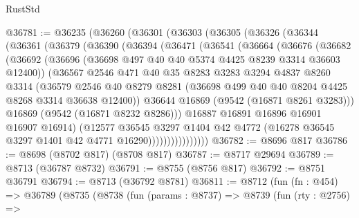 \begin{lexlean}{RustStd}
\begin{coremodule}
@36781 := @36235
    (@36260
      (@36301
        (@36303
          (@36305
            (@36326
              (@36344
                (@36361
                  (@36379
                    (@36390
                      (@36394
                        (@36471
                          (@36541
                            (@36664
                              (@36676
                                (@36682
                                  (@36692
                                    (@36696
                                      (@36698 @497 @40 @40 @5374 @4425 @8239 @3314 @36603 @12400))
                                    (@36567
                                      @2546
                                      @471
                                      @40
                                      @35
                                      @8283
                                      @3283
                                      @3294
                                      @4837
                                      @8260
                                      @3314
                                      (@36579
                                        @2546
                                        @40
                                        @8279
                                        @8281
                                        (@36698 @499 @40 @40 @8204 @4425 @8268 @3314 @36638 @12400))
                                      @36644
                                      @16869
                                      (@9542 (@16871 @8261 @3283)))
                                    @16869
                                    (@9542 (@16871 @8232 @8286)))
                                  @16887
                                  @16891
                                  @16896
                                  @16901
                                  @16907
                                  @16914)
                                (@12577
                                  @36545
                                  @3297
                                  @1404
                                  @42
                                  @4772
                                  (@16278 @36545 @3297 @1401 @42 @4771 @16290))))))))))))))))
@36782 := @8696 @817
@36786 := @8698 (@8702 @817) (@8708 @817)
@36787 := @8717 @29694
@36789 := @8713 (@36787 @8732)
@36791 := @8755 (@8756 @817)
@36792 := @8751 @36791
@36794 := @8713 (@36792 @8781)
@36811 := @8712
    (fun (fn : @454) =>
    @36789
      (@8735
        (@8738
          (fun (params : @8737) =>
          @8739
            (fun (rty : @2756) =>

\end{coremodule}
\end{lexlean}
